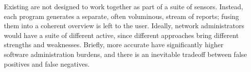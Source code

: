 Existing \idses are not designed to work together as part of a
suite of sensors.  Instead, each program generates a separate,
often voluminous, stream of reports; fusing them into a coherent 
overview is left
 to
the user. 
Ideally, network administrators would have a suite of different \idses active,
since different \ids approaches
bring different
strengths and weaknesses.
Briefly, more accurate \idses have significantly higher software
administration burdens, and there is an inevitable tradeoff between
false positives and false negatives.
 
